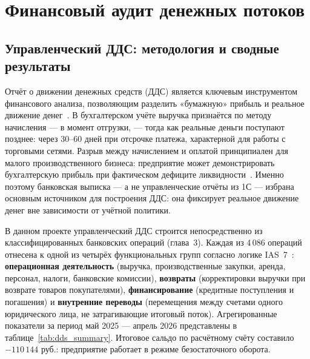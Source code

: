 \chapter{Финансовый аудит денежных потоков}
\label{ch:dds}

\section{Управленческий ДДС: методология и сводные результаты}

Отчёт о движении денежных средств (ДДС) является ключевым инструментом финансового анализа, позволяющим разделить «бумажную» прибыль и реальное движение денег~\cite{ias7}. В бухгалтерском учёте выручка признаётся по методу начисления --- в момент отгрузки, --- тогда как реальные деньги поступают позднее: через 30--60 дней при отсрочке платежа, характерной для работы с торговыми сетями. Разрыв между начислением и оплатой принципиален для малого производственного бизнеса: предприятие может демонстрировать бухгалтерскую прибыль при фактическом дефиците ликвидности~\cite{penman2013financial}. Именно поэтому банковская выписка --- а не управленческие отчёты из 1С --- избрана основным источником для построения ДДС: она фиксирует реальное движение денег вне зависимости от учётной политики.

В данном проекте управленческий ДДС строится непосредственно из классифицированных банковских операций (глава~3). Каждая из 4\,086 операций отнесена к одной из четырёх функциональных групп согласно логике IAS~7~\cite{ias7}: \textbf{операционная деятельность} (выручка, производственные закупки, аренда, персонал, налоги, банковские комиссии), \textbf{возвраты} (корректировки выручки при возврате товаров покупателями), \textbf{финансирование} (кредитные поступления и погашения) и \textbf{внутренние переводы} (перемещения между счетами одного юридического лица, не затрагивающие итоговый поток). Агрегированные показатели за период май 2025 --- апрель 2026 представлены в таблице~\ref{tab:dds_summary}. Итоговое сальдо по расчётному счёту составило $-110\,144$ руб.: предприятие работает в режиме безостаточного оборота.

